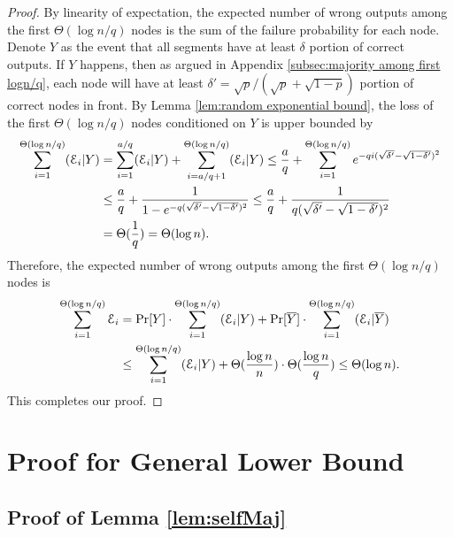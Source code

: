 \documentclass[a4paper,UKenglish]{lipics}
\theoremstyle{definition}
\begin{document}
\begin{proof}
By linearity of expectation, the expected number of wrong outputs among the first $\Theta(\log n/q)$ nodes 
	is the sum of the failure probability for each node. 
Denote $Y$ as the event that all segments have at least $\delta$ portion of correct outputs.
If $Y$ happens, then as argued in Appendix \ref{subsec:majority among first logn/q}, 
	each node will have at least $\delta' = {\sqrt{p}/(\sqrt{p}+\sqrt{1-p})}$ portion of correct nodes in front.
By Lemma \ref{lem:random exponential bound}, the loss of the first $\Theta(\log n/q)$ nodes conditioned on $Y$ is upper bounded by
\begin{align*}
	\sum_{i=1}^{\Theta(\log n/q)} (\mathcal{E}_i|Y)
& =
	\sum_{i=1}^{a/q} (\mathcal{E}_i|Y) + \sum_{i=a/q+1}^{\Theta(\log n/q)} (\mathcal{E}_i|Y)
	\le
	{a \over q} + \sum_{i=1}^{\Theta(\log n/q)} e^{-qi(\sqrt{\delta'} - \sqrt{1 - \delta'})^2} \\
& \le
	{a \over q} + { 1 \over 1 - e^{-q(\sqrt{\delta'} - \sqrt{1 - \delta'})^2} }
	\le
	{a \over q} + {1 \over q(\sqrt{\delta'} - \sqrt{1 - \delta'})^2 } \\
& =
	\Theta ({1\over q})
	=
	\Theta(\log n).
\end{align*}
Therefore, the expected number of wrong outputs among the first $\Theta(\log n/q)$ nodes is
\begin{align*}
	\sum_{i=1}^{\Theta(\log n/q)} \mathcal{E}_i
& =
	\Pr[Y]\cdot \sum_{i=1}^{\Theta(\log n/q)} (\mathcal{E}_i|Y) + \Pr[\overline Y]\cdot \sum_{i=1}^{\Theta(\log n/q)} (\mathcal{E}_i|\overline Y) \\
& \le
	\sum_{i=1}^{\Theta(\log n/q)} (\mathcal{E}_i|Y) +  \Theta({\log n \over n})\cdot \Theta({\log n \over q})
	\le
	\Theta(\log n).
\end{align*}
This completes our proof.
\end{proof}









\section{Proof for General Lower Bound}

\subsection{Proof of Lemma \ref{lem:selfMaj}}
\label{subsec:selfMaj}
\end{document}
